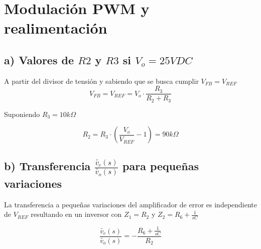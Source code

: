 \documentclass[e4_tp2_main.tex]{subfiles}
\begin{document}

\section{Modulación PWM y realimentación}
\subsection*{a) Valores de $R2$ y $R3$ si $V_o=25 VDC$}

A partir del divisor de tensi\'on y sabiendo que se busca cumplir $V_{FB}=V_{REF}$
$$V_{FB}=V_{REF}= V_o \cdot \frac{R_3}{R_2+R_3}$$

Suponiendo $R_3=10k \Omega $

$$R_2=R_3 \cdot \left( \frac{V_o}{V_{REF}} - 1 \right)=90k \Omega $$


\subsection*{b) Transferencia  $\frac{ \widetilde{v_c}(s)}{\widetilde{v_o}(s)}$ para pequeñas variaciones} 

La transferencia a pequeñas variaciones del amplificador de error es independiente de $V_{REF}$ resultando en un inversor con $Z_1=R_2$ y $Z_2=R_6 + \frac{1}{sC}$

$$\frac{\widetilde{v_c}(s)}{\widetilde{v_o}(s)}=-\frac{R_6 + \frac{1}{sC} }{R_2}$$
\end{document}
